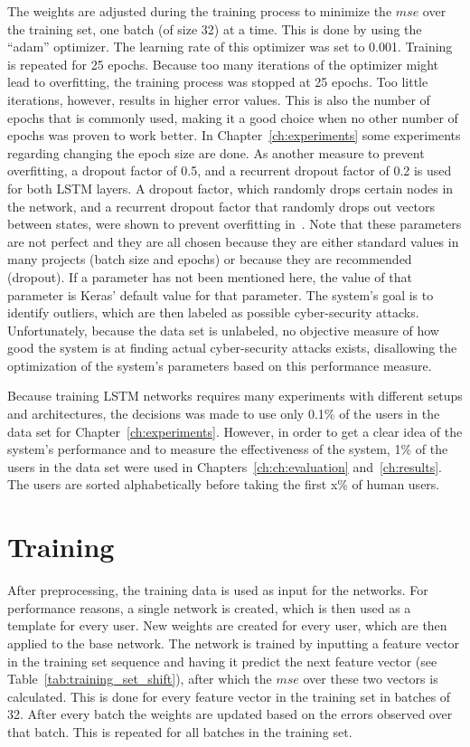 The weights are adjusted during the training process to minimize the \(mse\) over the training set, one batch (of size 32) at a time. This is done by using the \enquote{adam} optimizer. The learning rate of this optimizer was set to 0.001. Training is repeated for 25 epochs. Because too many iterations of the optimizer might lead to overfitting, the training process was stopped at 25 epochs. Too little iterations, however, results in higher error values. This is also the number of epochs that is commonly used, making it a good choice when no other number of epochs was proven to work better. In Chapter~\ref{ch:experiments} some experiments regarding changing the epoch size are done. As another measure to prevent overfitting, a dropout factor of 0.5, and a recurrent dropout factor of 0.2 is used for both LSTM layers. A dropout factor, which randomly drops certain nodes in the network, and a recurrent dropout factor that randomly drops out vectors between states, were shown to prevent overfitting in~\cite{srivastava2014dropout}. Note that these parameters are not perfect and they are all chosen because they are either standard values in many projects (batch size and epochs) or because they are recommended (dropout). If a parameter has not been mentioned here, the value of that parameter is Keras' default value for that parameter. The system's goal is to identify outliers, which are then labeled as possible cyber-security attacks. Unfortunately, because the data set is unlabeled, no objective measure of how good the system is at finding actual cyber-security attacks exists, disallowing the optimization of the system's parameters based on this performance measure.

Because training LSTM networks requires many experiments with different setups and architectures, the decisions was made to use only 0.1\% of the users in the data set for Chapter~\ref{ch:experiments}. However, in order to get a clear idea of the system's performance and to measure the effectiveness of the system, 1\% of the users in the data set were used in Chapters~\ref{ch:ch:evaluation} and~\ref{ch:results}. The users are sorted alphabetically before taking the first x\% of human users.

\section{Training}
After preprocessing, the training data is used as input for the networks. For performance reasons, a single network is created, which is then used as a template for every user. New weights are created for every user, which are then applied to the base network. The network is trained by inputting a feature vector in the training set sequence and having it predict the next feature vector (see Table~\ref{tab:training_set_shift}), after which the \(mse\) over these two vectors is calculated. This is done for every feature vector in the training set in batches of 32. After every batch the weights are updated based on the errors observed over that batch. This is repeated for all batches in the training set.

